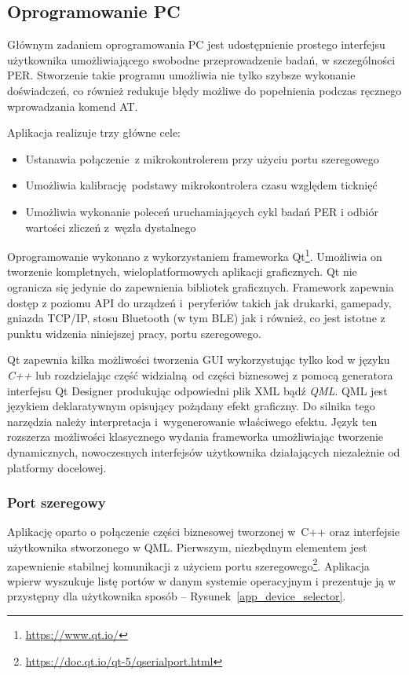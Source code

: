 \subsection{Oprogramowanie PC} \label{prep:pc-software}

Głównym zadaniem oprogramowania PC jest udostępnienie prostego interfejsu
użytkownika umożliwiającego swobodne przeprowadzenie badań, w szczególności PER. 
Stworzenie takie programu umożliwia nie tylko szybsze wykonanie doświadczeń, co
również redukuje błędy możliwe do popełnienia podczas ręcznego wprowadzania 
komend \gls{AT}.

Aplikacja realizuje trzy główne cele: 
\begin{itemize}
\item Ustanawia połączenie z mikrokontrolerem przy użyciu portu szeregowego
\item Umożliwia kalibrację podstawy mikrokontrolera czasu względem ticknięć 
\item Umożliwia wykonanie poleceń uruchamiających cykl badań PER i odbiór wartości
zliczeń z~węzła dystalnego
\end{itemize}

Oprogramowanie wykonano z wykorzystaniem frameworka Qt\footnote{\url{https://www.qt.io/}}.
Umożliwia on tworzenie kompletnych, wieloplatformowych aplikacji graficznych. Qt nie
ogranicza się jedynie do zapewnienia bibliotek graficznych. Framework zapewnia
dostęp z poziomu \gls{API} do urządzeń i~peryferiów takich jak drukarki,
gamepady, gniazda TCP/IP, stosu Bluetooth (w tym BLE) jak i również,
co jest istotne z punktu widzenia niniejszej pracy, portu szeregowego.

Qt zapewnia kilka możliwości tworzenia GUI wykorzystując tylko kod w języku \textit{C++}
lub rozdzielając część widzialną od części biznesowej z pomocą generatora interfejsu
Qt Designer produkując odpowiedni plik \gls{XML} bądź \textit{QML}. QML jest językiem
deklaratywnym opisujący pożądany efekt graficzny. Do silnika tego narzędzia należy
interpretacja i~wygenerowanie właściwego efektu. Język ten rozszerza możliwości
klasycznego wydania frameworka umożliwiając tworzenie dynamicznych, nowoczesnych 
interfejsów użytkownika działających niezależnie od platformy docelowej.

\subsubsection{Port szeregowy}
Aplikację oparto o połączenie części biznesowej tworzonej w~C++ oraz interfejsie
użytkownika stworzonego w QML. Pierwszym, niezbędnym elementem jest zapewnienie
stabilnej komunikacji z użyciem portu szeregowego\footnote{\url{https://doc.qt.io/qt-5/qserialport.html}}.
Aplikacja wpierw wyszukuje listę portów w danym systemie operacyjnym i prezentuje ją
w przystępny dla użytkownika sposób -- Rysunek~\ref{app_device_selector}.

